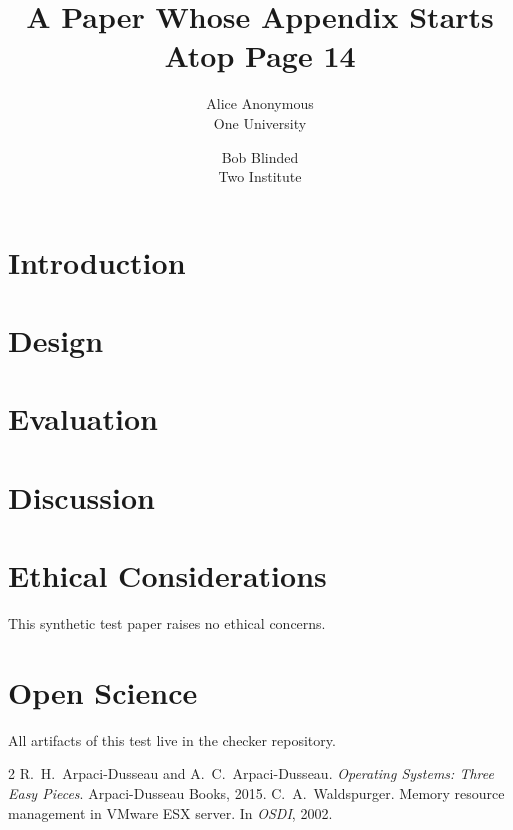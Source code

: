 \documentclass[letterpaper,twocolumn,10pt]{article}
\date{}
\title{\Large \bf A Paper Whose Appendix Starts Atop Page 14}
\author{{\rm Alice Anonymous}\\One University \and {\rm Bob Blinded}\\Two Institute}
\begin{document}
\maketitle

\begin{abstract}
\lipsum[1][1-5]
\end{abstract}

\section{Introduction}
\lipsum[1-30]

\section{Design}
\lipsum[31-60]

\section{Evaluation}
\lipsum[61-90]

\section{Discussion}
\lipsum[91-120]

\clearpage
\appendix
\section*{Ethical Considerations}
This synthetic test paper raises no ethical concerns.

\section*{Open Science}
All artifacts of this test live in the checker repository.

\begin{thebibliography}{2}
 R.~H.\ Arpaci-Dusseau and A.~C.\ Arpaci-Dusseau.
  \emph{Operating Systems: Three Easy Pieces}. Arpaci-Dusseau Books, 2015.
 C.~A.\ Waldspurger. Memory resource management in VMware ESX
  server. In \emph{OSDI}, 2002.
\end{thebibliography}
\end{document}
